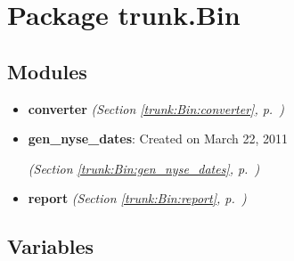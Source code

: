 %
%
%


\section{Package trunk.Bin}

    \label{trunk:Bin}


\subsection{Modules}

\begin{itemize}
\setlength{\parskip}{0ex}
\item \textbf{converter}
  \textit{(Section \ref{trunk:Bin:converter}, p.~\pageref{trunk:Bin:converter})}

\item \textbf{gen\_nyse\_dates}: Created on March 22, 2011



  \textit{(Section \ref{trunk:Bin:gen_nyse_dates}, p.~\pageref{trunk:Bin:gen_nyse_dates})}

\item \textbf{report}
  \textit{(Section \ref{trunk:Bin:report}, p.~\pageref{trunk:Bin:report})}

\end{itemize}



  \subsection{Variables}

